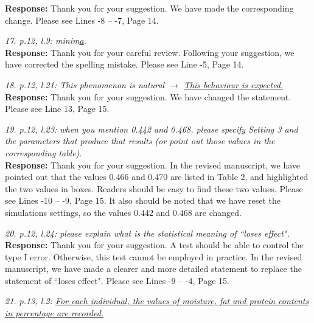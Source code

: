 \documentclass[12pt]{report}
\begin{document}
\begin{description}
{ \bf Response: } Thank you for your suggestion. We have made the corresponding change. Please see Lines -8 -- -7, Page 14.

\item {{ \textcolor[rgb]{0.00,0.50,1.00}{\em 17.  p.12, l.9: minim\uline{a}.
}}}\\

{ \bf Response: } Thank you for your careful review. Following your suggestion, we have corrected the spelling mistake. Please see Line -5, Page 14.\\

\item {{ \textcolor[rgb]{0.00,0.50,1.00}{\em 18.  p.12, l.21: This phenomenon is natural $\rightarrow$ \uline{This behaviour is expected.}
}}}\\

{ \bf Response: } Thank you for your suggestion. We have changed the statement. Please see Line 13, Page 15.\\

\item {{ \textcolor[rgb]{0.00,0.50,1.00}{\em 19.  p.12, l.23: when you mention 0.442 and 0.468, please specify Setting 3 and the parameters
that produce that results (or point out those values in the corresponding table).
}}}\\

{ \bf Response: } Thank you for your suggestion.  In the revised manuscript,  we  have pointed out that the values 0.466 and 0.470 are listed in Table 2, and highlighted the two values in boxes. Readers should be easy to find these two values. Please see Lines -10 -- -9, Page 15. It also should be noted that we have reset the simulations settings, so the values 0.442 and 0.468 are changed.\\


\item {{ \textcolor[rgb]{0.00,0.50,1.00}{\em 20.  p.12, l.24: please explain what is the statistical meaning of ``loses effect".
}}}\\

{ \bf Response: } Thank you for your suggestion. A test should be able to  control the type I error.  Otherwise, this test cannot be employed in practice. In the revised manuscript, we have made a clearer and more detailed statement to replace the statement of ``loses effect". Please see Lines -9 -- -4, Page 15.\\

\item {{ \textcolor[rgb]{0.00,0.50,1.00}{\em 21.  p.13, l.2: \uline{For each individual, the values of moisture, fat and protein contents in percentage
are recorded.}
}}}\\


\end{description}
\end{document}
